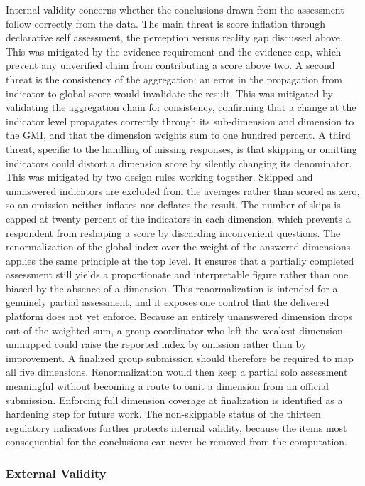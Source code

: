 Internal validity concerns whether the conclusions drawn from the assessment follow correctly from the data. The main threat is score inflation through declarative self assessment, the perception versus reality gap discussed above. This was mitigated by the evidence requirement and the evidence cap, which prevent any unverified claim from contributing a score above two. A second threat is the consistency of the aggregation: an error in the propagation from indicator to global score would invalidate the result. This was mitigated by validating the aggregation chain for consistency, confirming that a change at the indicator level propagates correctly through its sub-dimension and dimension to the GMI, and that the dimension weights sum to one hundred percent. A third threat, specific to the handling of missing responses, is that skipping or omitting indicators could distort a dimension score by silently changing its denominator. This was mitigated by two design rules working together. Skipped and unanswered indicators are excluded from the averages rather than scored as zero, so an omission neither inflates nor deflates the result. The number of skips is capped at twenty percent of the indicators in each dimension, which prevents a respondent from reshaping a score by discarding inconvenient questions. The renormalization of the global index over the weight of the answered dimensions applies the same principle at the top level. It ensures that a partially completed assessment still yields a proportionate and interpretable figure rather than one biased by the absence of a dimension. This renormalization is intended for a genuinely partial assessment, and it exposes one control that the delivered platform does not yet enforce. Because an entirely unanswered dimension drops out of the weighted sum, a group coordinator who left the weakest dimension unmapped could raise the reported index by omission rather than by improvement. A finalized group submission should therefore be required to map all five dimensions. Renormalization would then keep a partial solo assessment meaningful without becoming a route to omit a dimension from an official submission. Enforcing full dimension coverage at finalization is identified as a hardening step for future work. The non-skippable status of the thirteen regulatory indicators further protects internal validity, because the items most consequential for the conclusions can never be removed from the computation.

\subsubsection{External Validity}

